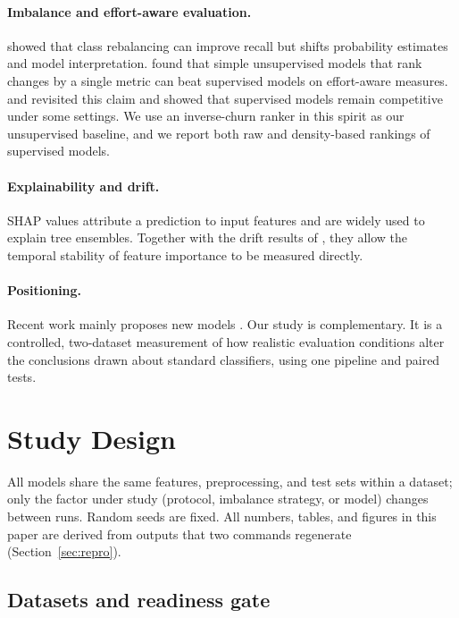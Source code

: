 \documentclass[11pt,a4paper]{article}
\begin{document}
\paragraph{Imbalance and effort-aware evaluation.}
\citet{tantithamthavorn2020} showed that class rebalancing can improve recall but shifts probability estimates and model interpretation. \citet{yang2016} found that simple unsupervised models that rank changes by a single metric can beat supervised models on effort-aware measures. \citet{fu2017} and \citet{huang2019} revisited this claim and showed that supervised models remain competitive under some settings. We use an inverse-churn ranker in this spirit as our unsupervised baseline, and we report both raw and density-based rankings of supervised models.

\paragraph{Explainability and drift.}
SHAP values \citep{lundberg2017} attribute a prediction to input features and are widely used to explain tree ensembles. Together with the drift results of \citet{mcintosh2018}, they allow the temporal stability of feature importance to be measured directly.

\paragraph{Positioning.}
Recent work mainly proposes new models \citep{hoang2019,hoang2020,pornprasit2021,sahar2024,vandinter2023}. Our study is complementary. It is a controlled, two-dataset measurement of how realistic evaluation conditions alter the conclusions drawn about standard classifiers, using one pipeline and paired tests.

\section{Study Design}\label{sec:design}

All models share the same features, preprocessing, and test sets within a dataset; only the factor under study (protocol, imbalance strategy, or model) changes between runs. Random seeds are fixed. All numbers, tables, and figures in this paper are derived from outputs that two commands regenerate (Section~\ref{sec:repro}).

\subsection{Datasets and readiness gate}\label{sec:data}
\end{document}

